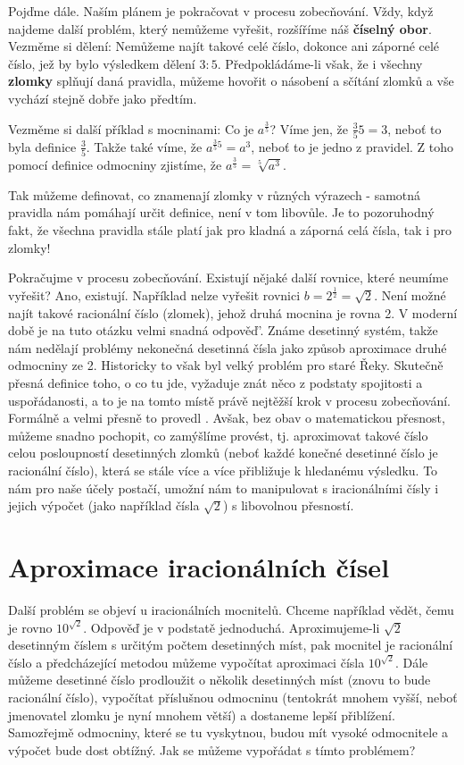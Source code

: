     Pojďme dále. Naším plánem je pokračovat v procesu zobecňování. Vždy, když najdeme další problém,
    který nemůžeme vyřešit, rozšíříme náš \textbf{číselný obor}. Vezměme si dělení: Nemůžeme najít
    takové celé číslo, dokonce ani záporné celé číslo, jež by bylo výsledkem dělení \(3:5\).
    Předpokládáme-li však, že i všechny \textbf{zlomky} splňují daná pravidla, můžeme hovořit o
    násobení a sčítání zlomků a vše vychází stejně dobře jako předtím.

    Vezměme si další příklad s mocninami: Co je \(a^\frac{3}{5}\)? Víme jen, že \(\frac{3}{5}5=3\),
    neboť to byla deﬁnice \(\frac{3}{5}\). Takže také víme, že \(a^{\frac{3}{5}5}=a^3\), neboť to je
    jedno z pravidel. Z toho pomocí deﬁnice odmocniny zjistíme, že \(a^\frac{3}{5}=\sqrt[5]{a^3}\).
    
    Tak můžeme definovat, co znamenají zlomky v různých výrazech - samotná pravidla nám pomáhají
    určit deﬁnice, není v tom libovůle. Je to pozoruhodný fakt, že všechna pravidla stále platí jak
    pro kladná a záporná celá čísla, tak i pro zlomky!

    Pokračujme v procesu zobecňování. Existují nějaké další rovnice, které neumíme vyřešit? Ano,
    existují. Například nelze vyřešit rovnici \(b=2^\frac{1}{2} =\sqrt{2}\). Není možné najít takové
    racionální číslo (zlomek), jehož druhá mocnina je rovna 2. V moderní době je na tuto otázku
    velmi snadná odpověď'. Známe desetinný systém, takže nám nedělají problémy nekonečná desetinná
    čísla jako způsob aproximace druhé odmocniny ze 2. Historicky to však byl velký problém pro
    staré Řeky. Skutečně přesná deﬁnice toho, o co tu jde, vyžaduje znát něco z podstaty spojitosti
    a uspořádanosti, a to je na tomto místě právě nejtěžší krok v procesu zobecňování. Formálně a
    velmi přesně to provedl \RichardDedekind. Avšak, bez obav o matematickou přesnost, můžeme snadno
    pochopit, co zamýšlíme provést, tj. aproximovat takové číslo celou posloupností desetinných
    zlomků (neboť každé konečné desetinné číslo je racionální číslo), která se stále více a více
    přibližuje k hledanému výsledku. To nám pro naše účely postačí, umožní nám to manipulovat s
    iracionálními čísly i jejich výpočet (jako například čísla \(\sqrt{2}\)) s libovolnou přesností.

  \section{Aproximace iracionálních čísel}\label{fyz:IchapXXIIsecIV}
    Další problém se objeví u iracionálních mocnitelů. Chceme například vědět, čemu je rovno
    \(10^{\sqrt{2}}\). Odpověď je v podstatě jednoduchá. Aproximujeme-li \(\sqrt{2}\) desetinným
    číslem s určitým počtem desetinných míst, pak mocnitel je racionální číslo a předcházející
    metodou můžeme vypočítat aproximaci čísla \(10^{\sqrt{2}}\). Dále můžeme desetinné číslo
    prodloužit o několik desetinných míst (znovu to bude racionální číslo), vypočítat příslušnou
    odmocninu (tentokrát mnohem vyšší, neboť jmenovatel zlomku je nyní mnohem větší) a dostaneme
    lepší přiblížení. Samozřejmě odmocniny, které se tu vyskytnou, budou mít vysoké odmocnitele a
    výpočet bude dost obtížný. Jak se můžeme vypořádat s tímto problémem?
  
